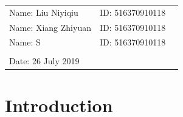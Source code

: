 \documentclass[12pt,a4paper]{article}
\begin{document}
\vspace*{0.25cm}

\hrulefill

\thispagestyle{empty}

\begin{center}
\begin{large}
\end{large}

\hrulefill

\vspace*{5cm}
\begin{Large}
\end{Large}

\vspace{2em}

\begin{large}
\end{large}
\end{center}


\vfill

\begin{table}[h!]
\flushleft
\begin{tabular}{lll}
Name: Liu Niyiqiu \hspace*{2em}&
ID: 516370910118\hspace*{2em}
\\
Name: Xiang Zhiyuan \hspace*{2em}&
ID: 516370910118\hspace*{2em}
\\
Name: S \hspace*{2em}&
ID: 516370910118\hspace*{2em}
\\


\\

Date: 26 July 2019
\end{tabular}
\end{table}

\hfill

\newpage
\tableofcontents
\newpage
\section{Introduction}
\end{document}
